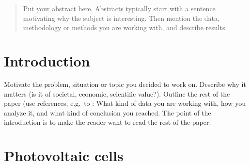\documentclass{article}
\begin{document}
\printAffiliationsAndNotice{\icmlEqualContribution} %

\begin{abstract}
Put your abstract here. Abstracts typically start with a sentence motivating why the subject is interesting. Then mention the data, methodology or methods you are working with, and describe results. 
\end{abstract}

\section{Introduction}\label{sec:intro}

Motivate the problem, situation or topic you decided to work on. Describe why it matters (is it of societal, economic, scientific value?). Outline the rest of the paper (use references, e.g.~to : What kind of data you are working with, how you analyze it, and what kind of conclusion you reached. The point of the introduction is to make the reader want to read the rest of the paper.

\section{Photovoltaic cells}\label{sec:pv}
\end{document}
